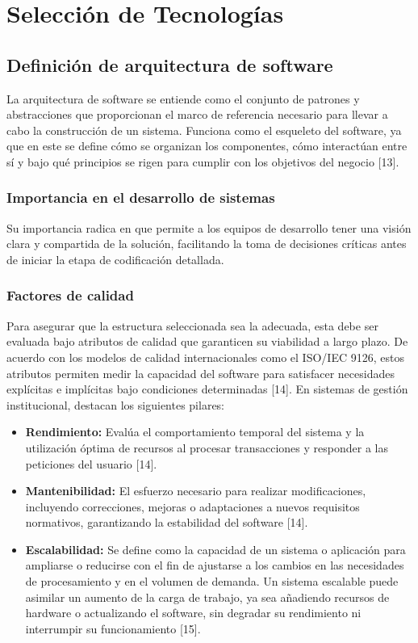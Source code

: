 
\chapter{Selección de Tecnologías}
\label{cap:tecnologias}

\section{Definición de arquitectura de software}
La arquitectura de software se entiende como el conjunto de patrones y abstracciones que proporcionan el marco de referencia necesario para llevar a cabo la construcción de un sistema. Funciona como el esqueleto del software, ya que en este se define cómo se organizan los componentes, cómo interactúan entre sí y bajo qué principios se rigen para cumplir con los objetivos del negocio [13]. 

\subsection{Importancia en el desarrollo de sistemas}
Su importancia radica en que permite a los equipos de desarrollo tener una visión clara y compartida de la solución, facilitando la toma de decisiones críticas antes de iniciar la etapa de codificación detallada. 

\subsection{Factores de calidad}
Para asegurar que la estructura seleccionada sea la adecuada, esta debe ser evaluada bajo atributos de calidad que garanticen su viabilidad a largo plazo. De acuerdo con los modelos de calidad internacionales como el ISO/IEC 9126, estos atributos permiten medir la capacidad del software para satisfacer necesidades explícitas e implícitas bajo condiciones determinadas [14]. En sistemas de gestión institucional, destacan los siguientes pilares:
\begin{itemize}
   \item \textbf{Rendimiento:}  Evalúa el comportamiento temporal del sistema y la utilización óptima de recursos al procesar transacciones y responder a las peticiones del usuario [14].
   \item \textbf{Mantenibilidad:}  El esfuerzo necesario para realizar modificaciones, incluyendo correcciones, mejoras o adaptaciones a nuevos requisitos normativos, garantizando la estabilidad del software [14].
    \item \textbf{Escalabilidad:} Se define como la capacidad de un sistema o aplicación para ampliarse o reducirse con el fin de ajustarse a los cambios en las necesidades de procesamiento y en el volumen de demanda. Un sistema escalable puede asimilar un aumento de la carga de trabajo, ya sea añadiendo recursos de hardware o actualizando el software, sin degradar su rendimiento ni interrumpir su funcionamiento [15].
\end{itemize}


